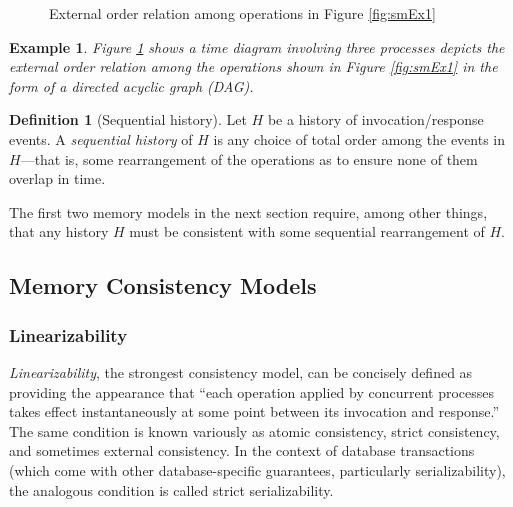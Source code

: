 \documentclass[]             %
{NASA}                       %
\newtheorem{example}{Example}
\theoremstyle{definition}
\newtheorem{definition}{Definition}[section]
\begin{document}
\begin{figure}[h]
    \centering
    
    \caption{External order relation among operations in Figure \ref{fig:smEx1}}
    \label{fig:smEx1DAG}
  \end{figure}

\begin{example}
  Figure \ref{fig:smEx1DAG} shows a time diagram involving three
  processes depicts the external order relation among the operations
  shown in Figure \ref{fig:smEx1} in the form of a directed acyclic
  graph (DAG).
\end{example}

\begin{definition}[Sequential history]
  Let $H$ be a history of invocation/response events. A
  \emph{sequential history} of $H$ is any choice of total order among
  the events in $H$---that is, some rearrangement of the operations as
  to ensure none of them overlap in time.
\end{definition}

The first two memory models in the next section require, among other
things, that any history $H$ must be consistent with some sequential
rearrangement of $H$.

\subsection{Memory Consistency Models}

\subsubsection{Linearizability}
\label{sssec:linearizability}

\emph{Linearizability}, the strongest consistency model, can be
concisely defined as providing the appearance that ``each operation
applied by concurrent processes takes effect instantaneously at some
point between its invocation and response.''
\cite{10.1145/78969.78972} The same condition is known variously as
atomic consistency, strict consistency, and sometimes external
consistency. In the context of database transactions (which come with
other database-specific guarantees, particularly serializability), the
analogous condition is called strict serializability.
\end{document}
